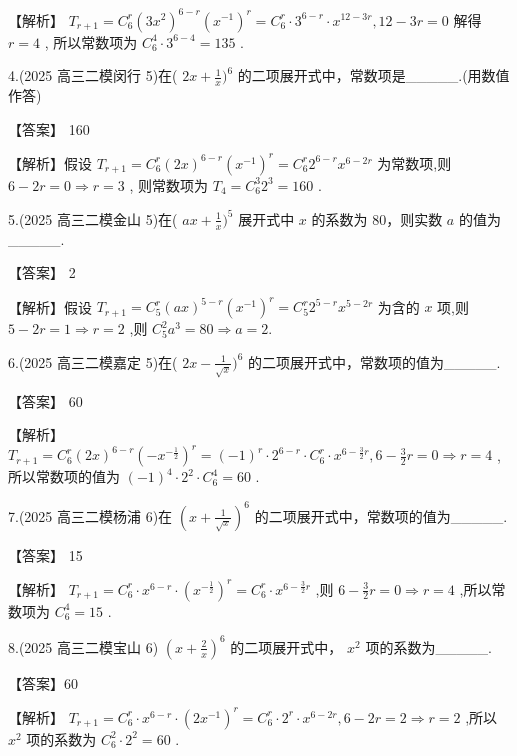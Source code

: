 \documentclass[10pt]{article}
\begin{document}
【解析】 \({T}_{r + 1} = {C}_{6}^{r}{\left( 3{x}^{2}\right) }^{6 - r}{\left( {x}^{-1}\right) }^{r} = {C}_{6}^{r} \cdot  {3}^{6 - r} \cdot  {x}^{{12} - {3r}},{12} - {3r} = 0\) 解得 \(r = 4\) , 所以常数项为 \({C}_{6}^{4} \cdot  {3}^{6 - 4} = {135}\) .

4.(2025 高三二模闵行 5)在( \({2x} + \frac{1}{x}{)}^{6}\) 的二项展开式中，常数项是\_\_\_\_\_.(用数值作答)

【答案】 160

【解析】假设 \({T}_{r + 1} = {C}_{6}^{r}{\left( 2x\right) }^{6 - r}{\left( {x}^{-1}\right) }^{r} = {C}_{6}^{r}{2}^{6 - r}{x}^{6 - {2r}}\) 为常数项,则 \(6 - {2r} = 0 \Rightarrow  r = 3\) , 则常数项为 \({T}_{4} = {C}_{6}^{3}{2}^{3} = {160}\) .

5.(2025 高三二模金山 5)在( \({ax} + \frac{1}{x}{)}^{5}\) 展开式中 \(x\) 的系数为 80，则实数 \(a\) 的值为\_\_\_\_\_.

【答案】 2

【解析】假设 \({T}_{r + 1} = {C}_{5}^{r}{\left( ax\right) }^{5 - r}{\left( {x}^{-1}\right) }^{r} = {C}_{5}^{r}{2}^{5 - r}{x}^{5 - {2r}}\) 为含的 \(x\) 项,则 \(5 - {2r} = 1 \Rightarrow  r = 2\) ,则 \({C}_{5}^{2}{a}^{3} = {80} \Rightarrow  a = 2.\)

6.(2025 高三二模嘉定 5)在( \({2x} - \frac{1}{\sqrt{x}}{)}^{6}\) 的二项展开式中，常数项的值为\_\_\_\_\_.

【答案】 60

【解析】 \({T}_{r + 1} = {C}_{6}^{r}{\left( 2x\right) }^{6 - r}{\left( -{x}^{-\frac{1}{2}}\right) }^{r} = {\left( -1\right) }^{r} \cdot  {2}^{6 - r} \cdot  {C}_{6}^{r} \cdot  {x}^{6 - \frac{3}{2}r},6 - \frac{3}{2}r = 0 \Rightarrow  r = 4\) , 所以常数项的值为 \({\left( -1\right) }^{4} \cdot  {2}^{2} \cdot  {C}_{6}^{4} = {60}\) .

7.(2025 高三二模杨浦 6)在 \({\left( x + \frac{1}{\sqrt{x}}\right) }^{6}\) 的二项展开式中，常数项的值为\_\_\_\_\_.

【答案】 15

【解析】 \({T}_{r + 1} = {C}_{6}^{r} \cdot  {x}^{6 - r} \cdot  {\left( {x}^{-\frac{1}{2}}\right) }^{r} = {C}_{6}^{r} \cdot  {x}^{6 - \frac{3}{2}r}\) ,则 \(6 - \frac{3}{2}r = 0 \Rightarrow  r = 4\) ,所以常数项为 \({C}_{6}^{4} = {15}\) .

8.(2025 高三二模宝山 6) \({\left( x + \frac{2}{x}\right) }^{6}\) 的二项展开式中， \({x}^{2}\) 项的系数为\_\_\_\_\_.

【答案】60

【解析】 \({T}_{r + 1} = {C}_{6}^{r} \cdot  {x}^{6 - r} \cdot  {\left( 2{x}^{-1}\right) }^{r} = {C}_{6}^{r} \cdot  {2}^{r} \cdot  {x}^{6 - {2r}},6 - {2r} = 2 \Rightarrow  r = 2\) ,所以 \({x}^{2}\) 项的系数为 \({C}_{6}^{2} \cdot  {2}^{2} = {60}\) .
\end{document}

